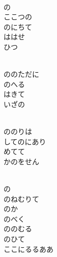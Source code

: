 \documentclass[10pt,b5j]{tarticle} %
\begin{document}
\vspace{1.5em} %
\newcommand{\linespace}{0.5em} %
\newcommand{\blocksize}{0.5\hsize} %
\newcommand{\itemmargin}{6em} %
\begin{enumerate} %
    \setlength{\itemindent}{\itemmargin} %
    \begin{minipage}[c]{\blocksize}
    
        \vspace{\linespace}
        \item~\\
        の\\
        ここつの\\
        のにちて\\
        ははせ\\
        ひつ
        
        \vspace{\linespace}
        \item~\\
        ののただに\\
        のへる\\
        はきて\\
        いざの
        
        \vspace{\linespace}
        \item~\\
        ののりは\\
        してのにあり\\
        めてて\\
        かのをせん
        
        \vspace{\linespace}
        \item~\\
        の\\
        のねむりて\\
        のか\\
        のべく\\
        ののむる\\
        のひて\\
        ここにるるああ
        

\end{minipage}
\end{enumerate}
\end{document}
